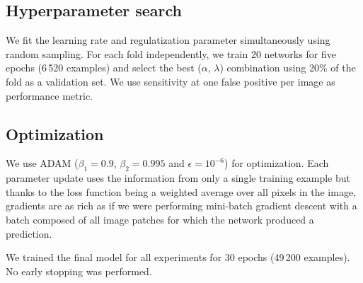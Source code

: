 \subsection{Hyperparameter search}
\label{subsec:Hyperparameters}
We fit the learning rate and regulatization parameter simultaneously using random sampling. For each fold independently, we train 20 networks for five epochs (6\,520 examples) and select the best ($\alpha$, $\lambda$) combination using 20\% of the fold as a validation set. We use sensitivity at one false positive per image as performance metric.

\subsection{Optimization}
We use ADAM ($\beta_1 = 0.9$, $\beta_2 = 0.995$ and $\epsilon = 10^{-6}$) for optimization.
Each parameter update uses the information from only a single training example but thanks to the loss function being a weighted average over all pixels in the image, gradients are as rich as if we were performing mini-batch gradient descent with a batch composed of all image patches for which the network produced a prediction.

We trained the final model for all experiments for 30 epochs (49\,200 examples). No early stopping was performed.
